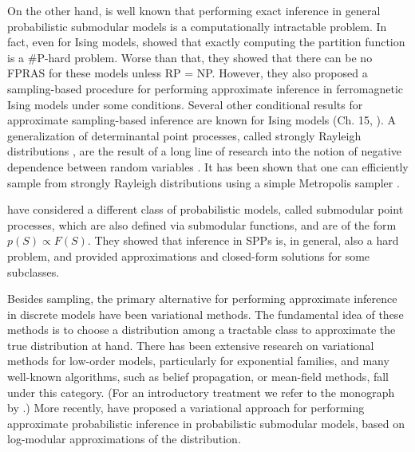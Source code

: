 On the other hand, is well known that performing exact inference in general probabilistic submodular models is a computationally intractable problem.
In fact, even for Ising models, \cite{jerrum93} showed that exactly computing the partition function is a \#P-hard problem.
Worse than that, they showed that there can be no FPRAS for these models unless RP = NP.
However, they also proposed a sampling-based procedure for performing approximate inference in ferromagnetic Ising models under some conditions.
Several other conditional results for approximate sampling-based inference are known for Ising models (Ch. 15, \citealp{levin08book}).
A generalization of determinantal point processes, called strongly Rayleigh distributions \citep{borcea08}, are the result of a long line of research into the notion of negative dependence between random variables \citep{pemantle00,liggett02,wagner08}.
It has been shown that one can efficiently sample from strongly Rayleigh distributions using a simple Metropolis sampler \citep{anari16,li16}.

\cite{iyer15} have considered a different class of probabilistic models, called submodular point processes, which are also defined via submodular functions, and are of the form $p(S) \propto F(S)$.
They showed that inference in SPPs is, in general, also a hard problem, and provided approximations and closed-form solutions for some subclasses.

Besides sampling, the primary alternative for performing approximate inference in discrete models have been variational methods.
The fundamental idea of these methods is to choose a distribution among a tractable class to approximate the true distribution at hand.
There has been extensive research on variational methods for low-order models, particularly for exponential families, and many well-known algorithms, such as belief propagation, or mean-field methods, fall under this category. (For an introductory treatment we refer to the monograph by \cite{wainwright08}.)
More recently, \citet{djolonga14} have proposed a variational approach for performing approximate probabilistic inference in probabilistic submodular models, based on log-modular approximations of the distribution.


